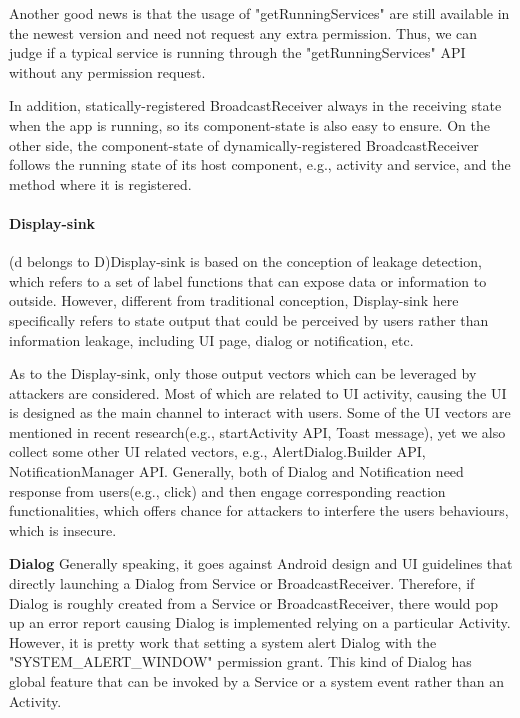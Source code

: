 Another good news is that the usage of  "getRunningServices" are still available in the newest version and need not request any extra permission. Thus, we can judge if a typical service is running through the "getRunningServices" API without any permission request. 

In addition, statically-registered BroadcastReceiver always in the receiving state when the app is running, so its component-state is also easy to ensure. On the other side, the component-state of dynamically-registered BroadcastReceiver follows the running state of its host component, e.g., activity and service, and the method where it is registered.


\paragraph{Display-sink}

(d belongs to D)Display-sink is based on the conception of leakage detection, which refers to a set of label functions that can expose data or information to outside. However, different from traditional conception, Display-sink here specifically refers to state output that could be perceived by users rather than information leakage, including UI page, dialog or notification, etc.

As to the Display-sink, only those output vectors which can be leveraged by attackers are considered. Most of which are related to UI activity, causing the UI is designed as the main channel to interact with users. Some of the UI vectors are mentioned in recent research\cite{bianchi2015app}(e.g., startActivity API, Toast message), yet we also collect some other UI related vectors, e.g., AlertDialog.Builder API, NotificationManager API. Generally, both of Dialog and Notification need response from users(e.g., click) and then engage corresponding reaction functionalities, which offers chance for attackers to interfere the users behaviours, which is insecure.

\textbf{Dialog}
Generally speaking, it goes against Android design and UI guidelines that directly launching a Dialog from Service or BroadcastReceiver. Therefore, if Dialog is roughly created from a Service or BroadcastReceiver, there would pop up an error report causing Dialog is implemented relying on a particular Activity. However, it is pretty work that setting a system alert Dialog with the "SYSTEM\_ALERT\_WINDOW" permission grant. This kind of Dialog has global feature that can be invoked by a Service or a system event rather than an Activity. 

